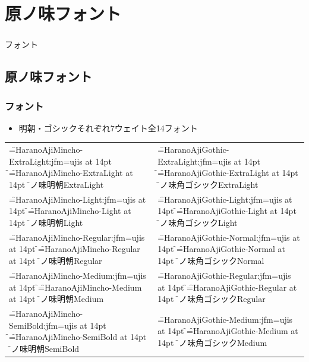 \section{原ノ味フォント}
\begin{frame}\frametitle{}
  \centering
  フォント
\end{frame}

\subsection{原ノ味フォント}
\begin{frame}\frametitle{フォント}
  \begin{itemize}
  \item \footnotesize 明朝・ゴシックそれぞれ7ウェイト全14フォント
  \end{itemize}

  \begin{tabular}{ll}
    \jfont\f=HaranoAjiMincho-ExtraLight:jfm=ujis at 14pt \f
    \font\f=HaranoAjiMincho-ExtraLight at 14pt \f
    原ノ味明朝ExtraLight
    &
    \jfont\f=HaranoAjiGothic-ExtraLight:jfm=ujis at 14pt \f
    \font\f=HaranoAjiGothic-ExtraLight at 14pt \f
    原ノ味角ゴシックExtraLight
    \\

    \jfont\f=HaranoAjiMincho-Light:jfm=ujis at 14pt \f
    \font\f=HaranoAjiMincho-Light at 14pt \f
    原ノ味明朝Light
    &
    \jfont\f=HaranoAjiGothic-Light:jfm=ujis at 14pt \f
    \font\f=HaranoAjiGothic-Light at 14pt \f
    原ノ味角ゴシックLight
    \\

    \jfont\f=HaranoAjiMincho-Regular:jfm=ujis at 14pt \f
    \font\f=HaranoAjiMincho-Regular at 14pt \f
    原ノ味明朝Regular
    &
    \jfont\f=HaranoAjiGothic-Normal:jfm=ujis at 14pt \f
    \font\f=HaranoAjiGothic-Normal at 14pt \f
    原ノ味角ゴシックNormal
    \\

    \jfont\f=HaranoAjiMincho-Medium:jfm=ujis at 14pt \f
    \font\f=HaranoAjiMincho-Medium at 14pt \f
    原ノ味明朝Medium
    &
    \jfont\f=HaranoAjiGothic-Regular:jfm=ujis at 14pt \f
    \font\f=HaranoAjiGothic-Regular at 14pt \f
    原ノ味角ゴシックRegular
    \\

    \jfont\f=HaranoAjiMincho-SemiBold:jfm=ujis at 14pt \f
    \font\f=HaranoAjiMincho-SemiBold at 14pt \f
    原ノ味明朝SemiBold
    &
    \jfont\f=HaranoAjiGothic-Medium:jfm=ujis at 14pt \f
    \font\f=HaranoAjiGothic-Medium at 14pt \f
    原ノ味角ゴシックMedium
    \\


\end{tabular}
\end{frame}
